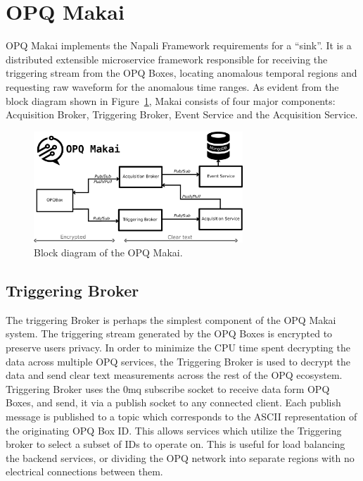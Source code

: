 \section{OPQ Makai}\label{sec:opq-makai}

OPQ Makai implements the Napali Framework requirements for a ``sink''.
 It is a distributed extensible microservice framework responsible for receiving the triggering stream from the OPQ Boxes, locating anomalous temporal regions and requesting raw waveform for the anomalous time ranges.
 As evident from the block diagram shown in Figure~\ref{fig:opq:10}, Makai consists of four major components: Acquisition Broker, Triggering Broker, Event Service and the Acquisition Service.
\begin{figure}[h]
  \begin{center}
  \includegraphics[width=0.7\textwidth]{img/makai_main.pdf}
  \end{center}
  \caption{Block diagram of the OPQ Makai.}
  \label{fig:opq:10}
\end{figure}

\subsection{Triggering Broker}\label{subsec:triggering-broker}

The triggering Broker is perhaps the simplest component of the OPQ Makai system.
The triggering stream generated by the OPQ Boxes is encrypted to preserve users privacy.
In order to minimize the CPU time spent decrypting the data across multiple OPQ services, the Triggering Broker is used to decrypt the data and send clear text measurements across the rest of the OPQ ecosystem.
Triggering Broker uses the 0mq subscribe socket to receive data form OPQ Boxes, and send, it via a publish socket to any connected client.
Each publish message is published to a topic which corresponds to the ASCII representation of the originating OPQ Box ID.
This allows services which utilize the Triggering broker to select a subset of IDs to operate on.
This is useful for load balancing the backend services, or dividing the OPQ network into separate regions with no electrical connections between them.

